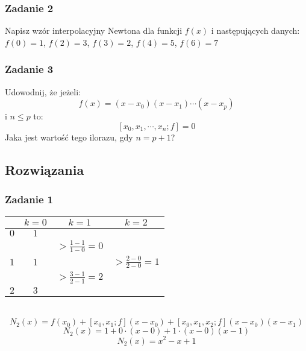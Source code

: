 \documentclass[a4paper]{article}
\begin{document}
\subsubsection*{Zadanie 2}
Napisz wzór interpolacyjny Newtona dla funkcji $f(x)$ i następujących danych: $f(0)=1$, $f(2)=3$, $f(3)=2$, $f(4)=5$, $f(6)=7$

\subsubsection*{Zadanie 3}
Udowodnij, że jeżeli:
$$f(x) = (x-x_0)(x-x_1)\cdots (x-x_p)$$
i $n\leq p$ to:
$$[x_0,x_1,\cdots,x_n;f] = 0$$
Jaka jest wartość tego ilorazu, gdy $n=p+1$?

\subsection{Rozwiązania}
\subsubsection*{Zadanie 1}
\begin{tabular}{|cccc|}
\hline
&$k=0$&$k=1$&$k=2$\\
\hline
$0$&$1$&&\\
&&$\Big>\frac{1-1}{1-0}=0$&\\
$1$&$1$&&$\Big>\frac{2-0}{2-0}=1$\\
&&$\Big>\frac{3-1}{2-1}=2$&\\
$2$&$3$&&\\
\hline
\end{tabular}\\
$$N_2(x) = f(x_0)+[x_0,x_1;f](x-x_0)+[x_0,x_1,x_2;f](x-x_0)(x-x_1)$$
$$N_2(x) = 1+0\cdot(x-0)+1\cdot(x-0)(x-1)$$
$$N_2(x) = x^2 - x + 1$$
\end{document}
